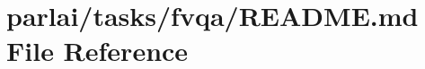 \hypertarget{parlai_2tasks_2fvqa_2README_8md}{}\section{parlai/tasks/fvqa/\+R\+E\+A\+D\+ME.md File Reference}
\label{parlai_2tasks_2fvqa_2README_8md}
